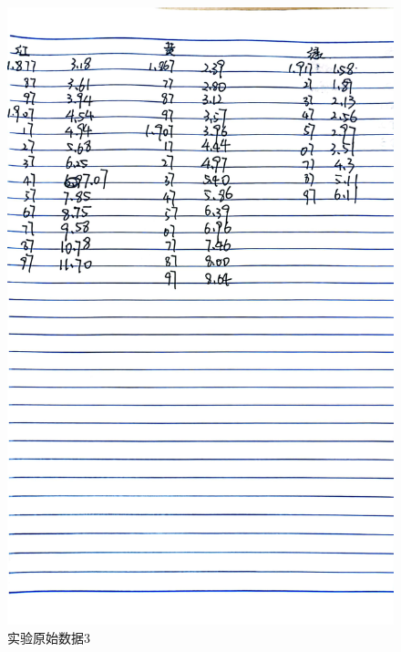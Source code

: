 \documentclass{ctexart}
\begin{document}
\begin{figure}[H]
  \centering
  \includegraphics[width=1\textwidth,height=0.8\textheight]{LED2.jpg}
  \caption{实验原始数据3}\label{LED2}
\end{figure}
\newpage
\end{document}
